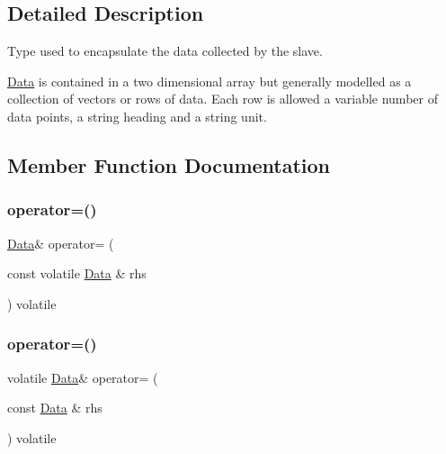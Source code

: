 \subsection{Detailed Description}
Type used to encapsulate the data collected by the slave. 

\mbox{\hyperlink{struct_data}{Data}} is contained in a two dimensional array but generally modelled as a collection of \textquotesingle{}vectors\textquotesingle{} or rows of data. Each row is allowed a variable number of data points, a string heading and a string unit. 

\subsection{Member Function Documentation}
\mbox{\label{struct_data_a3ae506c712bc36c15533f5499608a047}} 
\subsubsection{\texorpdfstring{operator=()}{operator=()}\hspace{0.1cm}{\footnotesize\ttfamily [1/2]}}
{\footnotesize\ttfamily \mbox{\hyperlink{struct_data}{Data}}\& operator= (\begin{DoxyParamCaption}\item[{const volatile \mbox{\hyperlink{struct_data}{Data}} \&}]{rhs }\end{DoxyParamCaption}) volatile\hspace{0.3cm}{\ttfamily [inline]}}

\mbox{\label{struct_data_a7c50ba562a0dcddc5ca2c733f1bbcb61}} 
\subsubsection{\texorpdfstring{operator=()}{operator=()}\hspace{0.1cm}{\footnotesize\ttfamily [2/2]}}
{\footnotesize\ttfamily volatile \mbox{\hyperlink{struct_data}{Data}}\& operator= (\begin{DoxyParamCaption}\item[{const \mbox{\hyperlink{struct_data}{Data}} \&}]{rhs }\end{DoxyParamCaption}) volatile\hspace{0.3cm}{\ttfamily [inline]}}




